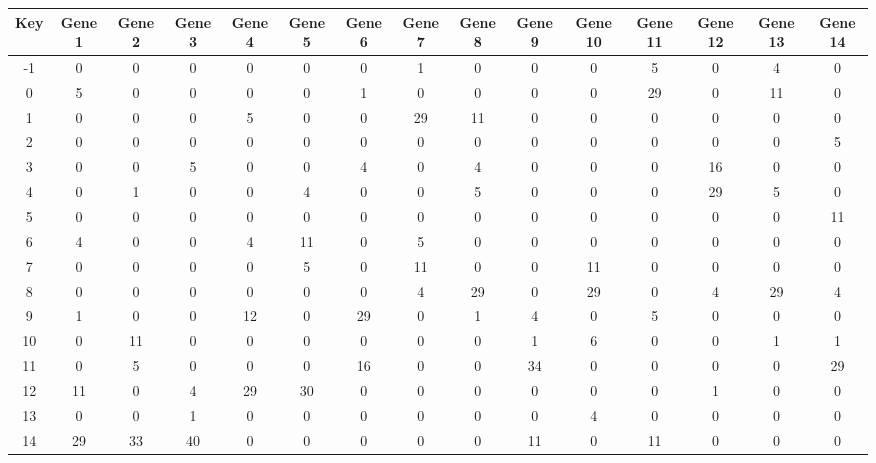 \begin{tabular}{|c|c|c|c|c|c|c|c|c|c|c|c|c|c|c|}
\hline
Key & Gene 1 & Gene 2 & Gene 3 & Gene 4 & Gene 5 & Gene 6 & Gene 7 & Gene 8 & Gene 9 & Gene 10 & Gene 11 & Gene 12 & Gene 13 & Gene 14 \\
\hline
-1 & 0 & 0 & 0 & 0 & 0 & 0 & 1 & 0 & 0 & 0 & 5 & 0 & 4 & 0 \\
0 & 5 & 0 & 0 & 0 & 0 & 1 & 0 & 0 & 0 & 0 & 29 & 0 & 11 & 0 \\
1 & 0 & 0 & 0 & 5 & 0 & 0 & 29 & 11 & 0 & 0 & 0 & 0 & 0 & 0 \\
2 & 0 & 0 & 0 & 0 & 0 & 0 & 0 & 0 & 0 & 0 & 0 & 0 & 0 & 5 \\
3 & 0 & 0 & 5 & 0 & 0 & 4 & 0 & 4 & 0 & 0 & 0 & 16 & 0 & 0 \\
4 & 0 & 1 & 0 & 0 & 4 & 0 & 0 & 5 & 0 & 0 & 0 & 29 & 5 & 0 \\
5 & 0 & 0 & 0 & 0 & 0 & 0 & 0 & 0 & 0 & 0 & 0 & 0 & 0 & 11 \\
6 & 4 & 0 & 0 & 4 & 11 & 0 & 5 & 0 & 0 & 0 & 0 & 0 & 0 & 0 \\
7 & 0 & 0 & 0 & 0 & 5 & 0 & 11 & 0 & 0 & 11 & 0 & 0 & 0 & 0 \\
8 & 0 & 0 & 0 & 0 & 0 & 0 & 4 & 29 & 0 & 29 & 0 & 4 & 29 & 4 \\
9 & 1 & 0 & 0 & 12 & 0 & 29 & 0 & 1 & 4 & 0 & 5 & 0 & 0 & 0 \\
10 & 0 & 11 & 0 & 0 & 0 & 0 & 0 & 0 & 1 & 6 & 0 & 0 & 1 & 1 \\
11 & 0 & 5 & 0 & 0 & 0 & 16 & 0 & 0 & 34 & 0 & 0 & 0 & 0 & 29 \\
12 & 11 & 0 & 4 & 29 & 30 & 0 & 0 & 0 & 0 & 0 & 0 & 1 & 0 & 0 \\
13 & 0 & 0 & 1 & 0 & 0 & 0 & 0 & 0 & 0 & 4 & 0 & 0 & 0 & 0 \\
14 & 29 & 33 & 40 & 0 & 0 & 0 & 0 & 0 & 11 & 0 & 11 & 0 & 0 & 0 \\
\hline
\end{tabular}